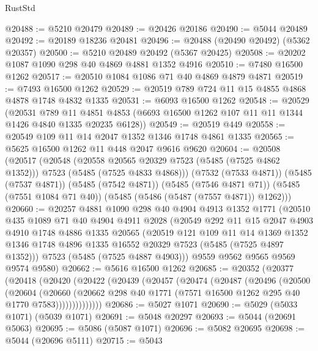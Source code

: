 \begin{lexlean}{RustStd}
\begin{coremodule}
@20488 := @5210 @20479
@20489 := @20426 @20186
@20490 := @5044 @20489
@20492 := @20189 @18236 @20481
@20496 := @20488 (@20490 @20492) (@5362 @20357)
@20500 := @5210 @20489 @20492 (@5367 @20425)
@20508 := @20202 @1087 @1090 @298 @40 @4869 @4881 @1352 @4916
@20510 := @7480 @16500 @1262
@20517 := @20510 @1084 @1086 @71 @40 @4869 @4879 @4871
@20519 := @7493 @16500 @1262
@20529 := @20519 @789 @724 @11 @15 @4855 @4868 @4878 @1748 @4832 @1335
@20531 := @6093 @16500 @1262
@20548 := @20529
    (@20531
      @789
      @11
      @4851
      @4853
      (@6693 @16500 @1262 @107 @11 @11 @1344 @1426 @4840 @1335 @20235 @6128))
@20549 := @20519 @449
@20558 := @20549 @109 @11 @14 @2047 @1352 @1346 @1748 @4861 @1335
@20565 := @5625 @16500 @1262 @11 @448 @2047 @9616 @9620
@20604 := @20508
    (@20517
      (@20548
        (@20558 @20565 @20329 @7523 (@5485 (@7525 @4862 @1352)))
        @7523
        (@5485 (@7525 @4833 @4868)))
      (@7532 (@7533 @4871))
      (@5485 (@7537 @4871))
      (@5485 (@7542 @4871))
      (@5485 (@7546 @4871 @71))
      (@5485 (@7551 @1084 @71 @40))
      (@5485 (@5486 (@5487 (@7557 @4871)) @1262)))
@20660 := @20257
    @4881
    @1090
    @298
    @40
    @4904
    @4913
    @1352
    @1771
    (@20510
      @435
      @1089
      @71
      @40
      @4904
      @4911
      @2028
      (@20549
        @292
        @11
        @15
        @2047
        @4903
        @4910
        @1748
        @4886
        @1335
        @20565
        (@20519
          @121
          @109
          @11
          @14
          @1369
          @1352
          @1346
          @1748
          @4896
          @1335
          @16552
          @20329
          @7523
          (@5485 (@7525 @4897 @1352)))
        @7523
        (@5485 (@7525 @4887 @4903)))
      @9559
      @9562
      @9565
      @9569
      @9574
      @9580)
@20662 := @5616 @16500 @1262
@20685 := @20352
    (@20377
      (@20418
        (@20420
          (@20422
            (@20439
              (@20457
                (@20474
                  (@20487
                    (@20496
                      (@20500
                        (@20604
                          (@20660
                            (@20662
                              @298
                              @40
                              @1771
                              (@7571 @16500 @1262 @295 @40 @1770 @7583))))))))))))))
@20686 := @5027 @1071
@20690 := @5029 (@5033 @1071) (@5039 @1071)
@20691 := @5048 @20297
@20693 := @5044 (@20691 @5063)
@20695 := @5086 (@5087 @1071)
@20696 := @5082 @20695
@20698 := @5044 (@20696 @5111)
@20715 := @5043

\end{coremodule}
\end{lexlean}
